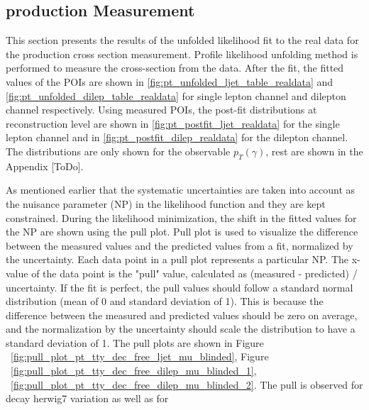\subsection{\tty production Measurement}
\label{sec:tty_prod_measurement}

This section presents the results of the unfolded likelihood fit to the real data for the \tty production cross section measurement. Profile likelihood unfolding method is performed to measure the cross-section from the data. %
After the fit, the fitted values of the POIs are shown in \cref{fig:pt_unfolded_ljet_table_realdata} and \cref{fig:pt_unfolded_dilep_table_realdata} for single lepton channel and dilepton channel respectively. Using measured POIs, the post-fit distributions at reconstruction level are shown in \cref{fig:pt_postfit_ljet_realdata} for the single lepton channel and in \cref{fig:pt_postfit_dilep_realdata} for the dilepton channel. The distributions are only shown for the observable $p_T(\gamma)$, rest are shown in the Appendix [ToDo].

As mentioned earlier that the systematic uncertainties are taken into account as the nuisance parameter (NP) in the likelihood function and they are kept constrained.
During the likelihood minimization, the shift in the fitted values for the NP are shown using the pull plot. Pull plot is used to visualize the difference between the measured values and the predicted values from a fit, normalized by the uncertainty. Each data point in a pull plot represents a particular NP. The x-value of the data point is the "pull" value, calculated as (measured - predicted) / uncertainty. If the fit is perfect, the pull values should follow a standard normal distribution (mean of 0 and standard deviation of 1). This is because the difference between the measured and predicted values should be zero on average, and the normalization by the uncertainty should scale the distribution to have a standard deviation of 1. The pull plots are shown in Figure ~\ref{fig:pull_plot_pt_tty_dec_free_ljet_mu_blinded}, Figure ~\ref{fig:pull_plot_pt_tty_dec_free_dilep_mu_blinded_1}, ~\ref{fig:pull_plot_pt_tty_dec_free_dilep_mu_blinded_2}. %
The pull is observed for \tty decay herwig7 variation as well as for 

